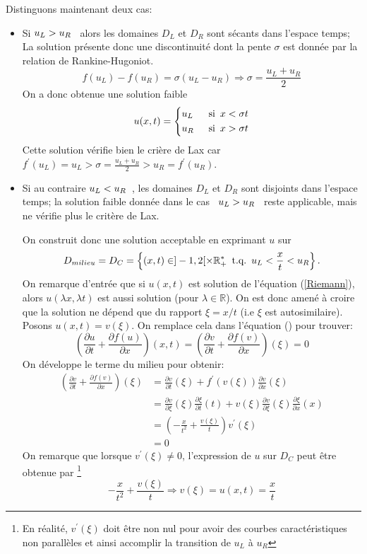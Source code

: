 \documentclass[
	french,
	11pt, %
]{fphw}
\newcommand{\hquad}{\hspace{0.5em}} %
\begin{document}
Distinguons maintenant deux cas:
\begin{itemize}[label=$\blacksquare$]
	\item Si $u_L > u_R \hquad$ alors les domaines $D_L$ et $D_R$ sont sécants dans l'espace temps; La solution présente donc une discontinuité dont la pente $\sigma$ est donnée par la relation de Rankine-Hugoniot.
	$$
	f(u_L) - f(u_R) = \sigma (u_L - u_R) \Longrightarrow \sigma = \frac{u_L + u_R}{2}
	$$
	On a donc obtenue une solution faible
	$$
	u(x,t) =
	\begin{dcases}
		u_L \hquad & \text{si} \hquad x < \sigma t \\	
		u_R \hquad & \text{si} \hquad x > \sigma t
	\end{dcases}
	$$
	Cette solution vérifie bien le crière de Lax car $f^\prime(u_L) = u_L > \sigma = \frac{u_L + u_R}{2} > u_R = f^\prime(u_R) $.

	\item Si au contraire $u_L < u_R \hquad$, les domaines $D_L$ et $D_R$ sont disjoints dans l'espace temps; la solution faible donnée dans le cas $\hquad u_L > u_R \hquad$ reste applicable, mais ne vérifie plus le critère de Lax.
	
	On construit donc une solution acceptable en exprimant $u$ sur $$D_{milieu} = D_C = \left\{ (x,t) \in ]-1,2[ \times \mathbb{R}_+^* \hquad \text{t.q.} \hquad u_L < \frac{x}{t} < u_R \right\}.$$ On remarque d'entrée que si $u(x,t)$ est solution de l'équation (\ref{Riemann}), alors $u(\lambda x,\lambda  t)$ est aussi solution (pour $\lambda \in \mathbb{R}$). On est donc amené à croire que la solution ne dépend que du rapport $ \xi = x/t$ (i.e $\xi$ est autosimilaire). Posons $u(x,t) = v(\xi)$. On remplace cela dans l'équation () pour trouver:
	$$
	\left( \frac{\partial u}{\partial t} + \frac{\partial f(u)}{\partial x}  \right)(x, t) = \left( \frac{\partial v}{\partial t} + \frac{\partial f(v)}{\partial x}  \right)(\xi) = 0 
	$$
	On développe le terme du milieu pour obtenir:
	\begin{align*}
		\left( \frac{\partial v}{\partial t} + \frac{\partial f(v)}{\partial x}  \right)(\xi) &= 	
		\frac{\partial v}{\partial t}(\xi) + f^\prime( v(\xi) ) \frac{\partial v}{\partial x}(\xi) \\
		&=  \frac{\partial v}{\partial \xi}(\xi)\frac{\partial \xi}{\partial t}(t) + v(\xi) \frac{\partial v}{\partial \xi}(\xi) \frac{\partial \xi}{\partial x}(x) \\
		&= \left( -\frac{x}{t^2} + \frac{v(\xi)}{t} \right) v^\prime (\xi)  \\
		&= 0
	\end{align*}
	On remarque que lorsque $v^\prime (\xi) \neq 0$, l'expression de $u$ sur $D_{C}$ peut être obtenue par \footnote{En réalité, $v^\prime(\xi)$ doit être non nul pour avoir des courbes caractéristiques non parallèles et ainsi accomplir la transition de $u_L$ à $u_R$} $$  -\frac{x}{t^2} + \frac{v(\xi)}{t} \Longrightarrow  v(\xi) = u(x,t) = \frac{x}{t} $$


\end{itemize}
\end{document}
